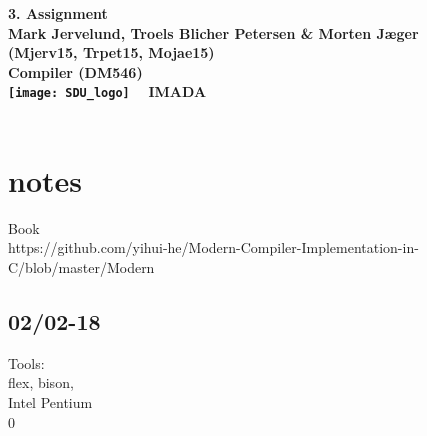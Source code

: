 \documentclass[a4paper,10pt,titlepage]{report}
\begin{document}
\begin{titlepage}
\centering
    \vspace*{9\baselineskip}
    \huge
    \bfseries
    3. Assignment \\
    \normalfont 
    Mark Jervelund, Troels Blicher Petersen \& Morten Jæger  \\
    (Mjerv15, Trpet15, Mojae15) \\
	\huge    
    Compiler (DM546)  \\[4\baselineskip]
    \normalfont
	\texttt{[image: SDU\_logo]}
    \vfill\ 
    \vspace{5mm}
    IMADA \\

    \textbf{\datedate} \\[2\baselineskip]
\end{titlepage}

\renewcommand{\thepage}{\roman{page}}%
\tableofcontents
\newpage
\setcounter{page}{1}
\renewcommand{\thepage}{\arabic{page}}


\newpage
\section{notes}
Book \\
https://github.com/yihui-he/Modern-Compiler-Implementation-in-C/blob/master/Modern%

\subsection{02/02-18}
Tools:\\
flex, bison,\\
Intel Pentium \\
0\\
\end{document}
